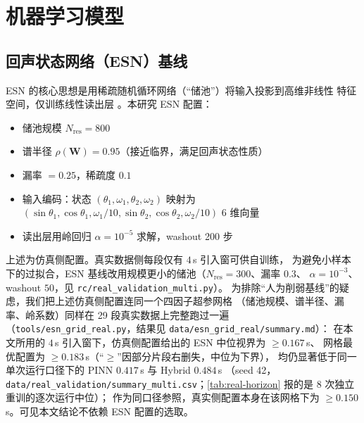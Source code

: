 \documentclass[a4paper,12pt]{ctexart}   %
\let\cite\supercite   %
\newcommand{\thetaone}{\theta_1}
\newcommand{\thetatwo}{\theta_2}
\begin{document}
\section{机器学习模型}
\label{sec:ai-models}

\subsection{回声状态网络（ESN）基线}
\label{sec:esn}
ESN 的核心思想是用稀疏随机循环网络（“储池”）将输入投影到高维非线性
特征空间，仅训练线性读出层 \cite{jaeger2004}。本研究 ESN 配置：
\begin{itemize}[leftmargin=2em]
  \item 储池规模 $N_{\mathrm{res}} = 800$
  \item 谱半径 $\rho(\bm{W}) = 0.95$（接近临界，满足回声状态性质）
  \item 漏率 $= 0.25$，稀疏度 $0.1$
  \item 输入编码：状态 $(\thetaone, \omega_1, \thetatwo, \omega_2)$ 映射为
        $(\sin\thetaone, \cos\thetaone, \omega_1 / 10, \sin\thetatwo, \cos\thetatwo, \omega_2 / 10)$
        6 维向量
  \item 读出层用岭回归 $\alpha = 10^{-5}$ 求解，washout 200 步
\end{itemize}
\noindent 上述为仿真侧配置。真实数据侧每段仅有 $4$\,s 引入窗可供自训练，
为避免小样本下的过拟合，ESN 基线改用规模更小的储池（$N_{\mathrm{res}} = 300$、漏率 $0.3$、
$\alpha = 10^{-3}$、washout $50$，见 \texttt{rc/real\_validation\_multi.py}）。
为排除“人为削弱基线”的疑虑，我们把上述仿真侧配置连同一个四因子超参网格
（储池规模、谱半径、漏率、岭系数）同样在 29 段真实数据上完整跑过一遍
（\texttt{tools/esn\_grid\_real.py}，结果见 \texttt{data/esn\_grid\_real/summary.md}）：
在本文所用的 $4$\,s 引入窗下，仿真侧配置给出的 ESN 中位视界为 $\ge 0.167$\,s、
网格最优配置为 $\ge 0.183$\,s（“$\ge$”因部分片段右删失，中位为下界），
均仍显著低于同一单次运行口径下的 PINN $0.417$\,s 与 Hybrid $0.484$\,s
（seed 42，\texttt{data/real\_validation/summary\_multi.csv}；\cref{tab:real-horizon} 报的是 8 次独立重训的逐次运行中位）；
作为同口径参照，真实侧配置本身在该网格下为 $\ge 0.150$\,s。可见本文结论不依赖 ESN 配置的选取。
\end{document}
